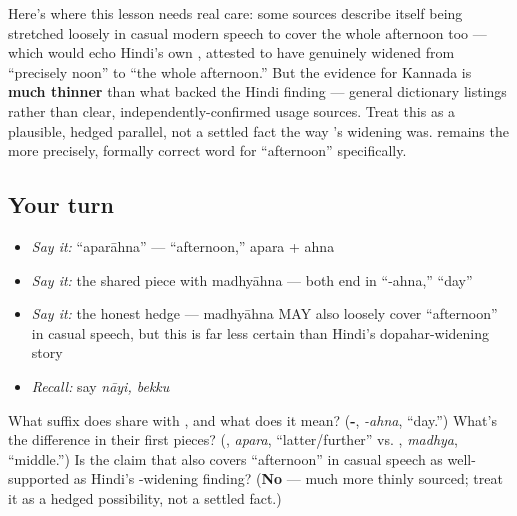 \begin{culture}
Here's where this lesson needs real care: some sources describe \textbf{} itself being stretched loosely in casual modern speech to cover the whole afternoon too — which would echo Hindi's own , attested to have genuinely widened from \textquotedblleft{}precisely noon\textquotedblright{} to \textquotedblleft{}the whole afternoon.\textquotedblright{} But the evidence for Kannada is \textbf{much thinner} than what backed the Hindi finding — general dictionary listings rather than clear, independently-confirmed usage sources. Treat this as a plausible, hedged parallel, not a settled fact the way 's widening was. \textbf{} remains the more precisely, formally correct word for \textquotedblleft{}afternoon\textquotedblright{} specifically.
\end{culture}

\subsection*{Your turn}
\begin{itemize}
\raggedright
  \item \emph{Say it:} \textquotedblleft{}aparāhna\textquotedblright{} — \textquotedblleft{}afternoon,\textquotedblright{} apara + ahna
  \item \emph{Say it:} the shared piece with madhyāhna — both end in \textquotedblleft{}-ahna,\textquotedblright{} \textquotedblleft{}day\textquotedblright{}
  \item \emph{Say it:} the honest hedge — madhyāhna MAY also loosely cover \textquotedblleft{}afternoon\textquotedblright{} in casual speech, but this is far less certain than Hindi's dopahar-widening story
  \item \emph{Recall:} say \emph{nāyi, bekku}
\end{itemize}

\begin{tcolorbox}[breakable,colback=teal!4,colframe=teal!35!black,title={Before you move on}]
What suffix does  share with , and what does it mean? (\textbf{-}, \emph{-ahna}, \textquotedblleft{}day.\textquotedblright{}) What's the difference in their first pieces? (\textbf{}, \emph{apara}, \textquotedblleft{}latter/further\textquotedblright{} vs. \textbf{}, \emph{madhya}, \textquotedblleft{}middle.\textquotedblright{}) Is the claim that  also covers \textquotedblleft{}afternoon\textquotedblright{} in casual speech as well-supported as Hindi's -widening finding? (\textbf{No} — much more thinly sourced; treat it as a hedged possibility, not a settled fact.)
\end{tcolorbox}
